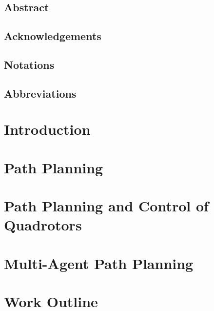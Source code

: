 \documentclass{thesisreport}
\begin{document}
  
 
\section*{Abstract}

\newpage
\section*{Acknowledgements}

\newpage

\section*{Notations}

\section*{Abbreviations}

 
\listoffigures

\tableofcontents


\chapter*{Introduction}


\chapter{Path Planning}
\label{chap:path}


\chapter{Path Planning and Control of Quadrotors}
\label{chap:planning_quadrotors}
 

\chapter{Multi-Agent Path Planning} 
\label{chap:multi}
 

\chapter{Work Outline}
\label{chap:work}

 
  
\newpage


 

 
 
 
 
\end{document}
